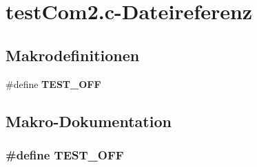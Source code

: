 \section{testCom2.c-\/Dateireferenz}
\label{test_com2_8c}
\subsection*{Makrodefinitionen}
\begin{DoxyCompactItemize}
\item 
\#define {\bf TEST\_\-OFF}
\end{DoxyCompactItemize}


\subsection{Makro-\/Dokumentation}
\subsubsection[{TEST\_\-OFF}]{\setlength{\rightskip}{0pt plus 5cm}\#define TEST\_\-OFF}\label{test_com2_8c_a8f6764e8e57eabbb14922404c0e25175}
